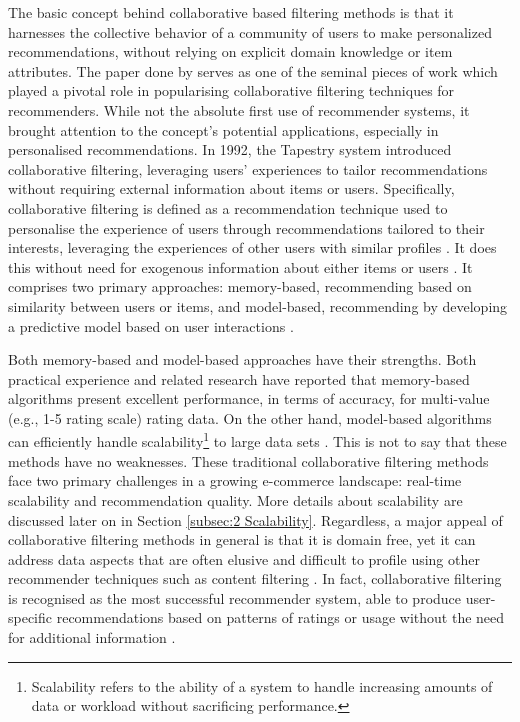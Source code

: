 The basic concept behind collaborative based filtering methods is that it harnesses the collective behavior of a community of users to make personalized recommendations, without relying on explicit domain knowledge or item attributes. The paper done by \cite{resnick1994grouplens} serves as one of the seminal pieces of work which played a pivotal role in popularising collaborative filtering techniques for recommenders. While not the absolute first use of recommender systems, it brought attention to the concept's potential applications, especially in personalised recommendations. In 1992, the Tapestry system \cite{goldberg1992using} introduced collaborative filtering, leveraging users' experiences to tailor recommendations without requiring external information about items or users. Specifically, collaborative filtering is defined as a recommendation technique used to personalise the experience of users through recommendations tailored to their interests, leveraging the experiences of other users with similar profiles \cite{herlocker1999algorithmic}. It does this without need for exogenous information about either items or users \cite{shapira2022recommender}. It comprises two primary approaches: memory-based, recommending based on similarity between users or items, and model-based, recommending by developing a predictive model based on user interactions \cite{symeonidis2008collaborative}. 

Both memory-based and model-based approaches have their strengths. Both practical experience and related research have reported that memory-based algorithms present excellent performance, in terms of accuracy, for multi-value (e.g., 1-5 rating scale) rating data. On the other hand, model-based algorithms can efficiently handle scalability\footnote{Scalability refers to the ability of a system to handle increasing amounts of data or workload without sacrificing performance.} to large data sets \cite{symeonidis2008collaborative}. This is not to say that these methods have no weaknesses. These traditional collaborative filtering methods face two primary challenges in a growing e-commerce landscape: real-time scalability and recommendation quality. More details about scalability are discussed later on in Section \ref{subsec:2 Scalability}. Regardless, a major appeal of collaborative filtering methods in general is that it is domain free, yet it can address data aspects that are often elusive and difficult to profile using other recommender techniques such as content filtering \cite{koren2009matrix}. In fact, collaborative filtering is recognised as the most successful recommender system, able to produce user-specific recommendations based on patterns of ratings or usage without the need for additional information \cite{koren2009matrix}. 


